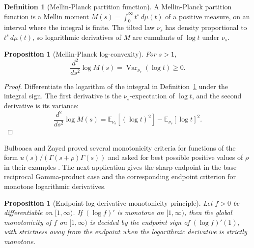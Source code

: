 \documentclass[11pt]{article}
\numberwithin{equation}{section}
\newtheorem{proposition}[theorem]{Proposition}
\theoremstyle{definition}
\newtheorem{definition}{Definition}[section]
\theoremstyle{remark}
\DeclareMathOperator{\Var}{Var}
\newcommand{\E}{\mathbb E}
\newcommand{\1}{\mathbf 1}
\begin{document}
\begin{definition}[Mellin-Planck partition function]
\label{def:mellin-planck-partition}
A Mellin-Planck partition function is a Mellin moment \(M(s)=\int_0^\infty t^s\,d\mu(t)\) of a positive measure, on an interval where the integral is finite. The tilted law \(\nu_s\) has density proportional to \(t^s\,d\mu(t)\), so logarithmic derivatives of \(M\) are cumulants of \(\log t\) under \(\nu_s\).
\end{definition}

\begin{proposition}[Mellin-Planck log-convexity]
\label{prop:mellin-planck-log-convexity}
For \(s>1\),
\begin{equation}
\label{eq:mellin-planck-log-convexity}
\frac{d^2}{ds^2}\log M(s)=\Var_{\nu_s}(\log t)\ge0.
\end{equation}
\end{proposition}

\begin{proof}
Differentiate the logarithm of the integral in Definition~\ref{def:mellin-planck-partition} under the integral sign.  The first derivative is the \(\nu_s\)-expectation of \(\log t\), and the second derivative is its variance:
\begin{equation}
\label{eq:mellin-planck-variance-proof}
\frac{d^2}{ds^2}\log M(s)
=\E_{\nu_s}[(\log t)^2]-\E_{\nu_s}[\log t]^2.
\end{equation}
\end{proof}

Bulboaca and Zayed proved several monotonicity criteria for functions of the form
\(u(s)/(\Gamma(s+\rho)\Gamma(s))\) and asked for best possible positive
values of \(\rho\) in their examples \cite{bulboaca-zayed-gamma}.  The next
application gives the sharp endpoint in the base reciprocal Gamma-product
case and the corresponding endpoint criterion for monotone logarithmic
derivatives.

\begin{proposition}[Endpoint log derivative monotonicity principle]
\label{res:endpoint-log-derivative-monotonicity-principle}
Let \(f>0\) be differentiable on \([1,\infty)\). If \((\log f)'\) is monotone on \([1,\infty)\), then the global monotonicity of \(f\) on \([1,\infty)\) is decided by the endpoint sign of \((\log f)'(1)\), with strictness away from the endpoint when the logarithmic derivative is strictly monotone.
\end{proposition}
\end{document}
